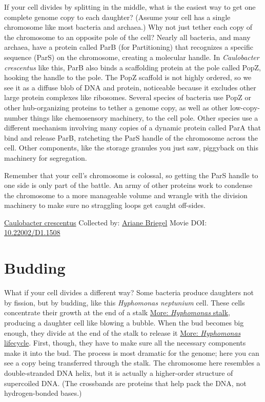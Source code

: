 \documentclass[]{tufte-book}
\begin{document}
If your cell divides by splitting in the middle, what is the easiest way to get one complete genome copy to each daughter? (Assume your cell has a single chromosome like most bacteria and archaea.) Why not just tether each copy of the chromosome to an opposite pole of the cell? Nearly all bacteria, and many archaea, have a protein called ParB (for Partitioning) that recognizes a specific sequence (ParS) on the chromosome, creating a molecular handle. In \emph{Caulobacter crescentus} like this, ParB also binds a scaffolding protein at the pole called PopZ, hooking the handle to the pole. The PopZ scaffold is not highly ordered, so we see it as a diffuse blob of DNA and protein, noticeable because it excludes other large protein complexes like ribosomes. Several species of bacteria use PopZ or other hub-organizing proteins to tether a genome copy, as well as other low-copy-number things like chemosensory machinery, to the cell pole. Other species use a different mechanism involving many copies of a dynamic protein called ParA that bind and release ParB, ratcheting the ParS handle of the chromosome across the cell. Other components, like the storage granules you just saw, piggyback on this machinery for segregation.

Remember that your cell's chromosome is colossal, so getting the ParS handle to one side is only part of the battle. An army of other proteins work to condense the chromosome to a more manageable volume and wrangle with the division machinery to make sure no straggling loops get caught off-sides.



\hypertarget{htmlwidget-0f2a0343c10c0174f0c4}{}

\label{fig:5-2}\protect\hyperlink{tree}{Caulobacter crescentus} Collected by: \protect\hyperlink{ariane_briegel}{Ariane Briegel} Movie DOI: \href{https://doi.org/10.22002/D1.1508}{10.22002/D1.1508}

\hypertarget{budding}{%
\section{Budding}\label{budding}}

What if your cell divides a different way? Some bacteria produce daughters not by fission, but by budding, like this \emph{Hyphomonas neptunium} cell. These cells concentrate their growth at the end of a stalk \protect\hyperlink{ux2aHyphomonasux2a_stalk}{More: \emph{Hyphomonas} stalk}, producing a daughter cell like blowing a bubble. When the bud becomes big enough, they divide at the end of the stalk to release it \protect\hyperlink{ux2aHyphomonasux2a_lifecycle}{More: \emph{Hyphomonas} lifecycle}. First, though, they have to make sure all the necessary components make it into the bud. The process is most dramatic for the genome; here you can see a copy being transferred through the stalk. The chromosome here resembles a double-stranded DNA helix, but it is actually a higher-order structure of supercoiled DNA. (The crossbands are proteins that help pack the DNA, not hydrogen-bonded bases.)
\end{document}
